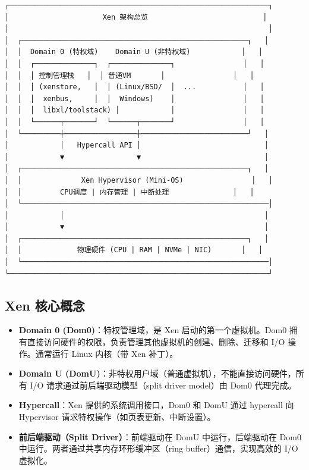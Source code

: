 \documentclass[12pt,UTF8]{ctexbook}
\begin{document}
\begin{lstlisting}
┌─────────────────────────────────────────────────────────────┐
│                      Xen 架构总览                           │
│                                                             │
│  ┌─────────────────────────────────────────────────────┐   │
│  │  Domain 0 (特权域)    Domain U (非特权域)            │   │
│  │  ┌──────────────┐  ┌──────────────┐                │   │
│  │  │ 控制管理栈   │  │ 普通VM       │                │   │
│  │  │ (xenstore,   │  │ (Linux/BSD/  │  ...           │   │
│  │  │  xenbus,     │  │  Windows)    │                │   │
│  │  │  libxl/toolstack) │            │                │   │
│  │  └──────┬───────┘  └──────┬───────┘                │   │
│  └─────────┼─────────────────┼─────────────────────────┘   │
│            │   Hypercall API │                             │
│            ▼                 ▼                             │
│  ┌─────────────────────────────────────────────────────┐   │
│  │              Xen Hypervisor (Mini-OS)                │   │
│  │         CPU调度 | 内存管理 | 中断处理               │   │
│  └──────────────────────────────────────────────────────────│
│            │                                               │
│            ▼                                               │
│  ┌─────────────────────────────────────────────────────┐   │
│  │             物理硬件 (CPU | RAM | NVMe | NIC)       │   │
│  └──────────────────────────────────────────────────────────│
└─────────────────────────────────────────────────────────────┘
\end{lstlisting}

\subsection*{Xen 核心概念}

\begin{itemize}
    \item \textbf{Domain 0 (Dom0)}：特权管理域，是 Xen 启动的第一个虚拟机。Dom0 拥有直接访问硬件的权限，负责管理其他虚拟机的创建、删除、迁移和 I/O 操作。通常运行 Linux 内核（带 Xen 补丁）。
    \item \textbf{Domain U (DomU)}：非特权用户域（普通虚拟机），不能直接访问硬件，所有 I/O 请求通过前后端驱动模型（split driver model）由 Dom0 代理完成。
    \item \textbf{Hypercall}：Xen 提供的系统调用接口，Dom0 和 DomU 通过 hypercall 向 Hypervisor 请求特权操作（如页表更新、中断设置）。
    \item \textbf{前后端驱动（Split Driver）}：前端驱动在 DomU 中运行，后端驱动在 Dom0 中运行。两者通过共享内存环形缓冲区（ring buffer）通信，实现高效的 I/O 虚拟化。
\end{itemize}
\end{document}
